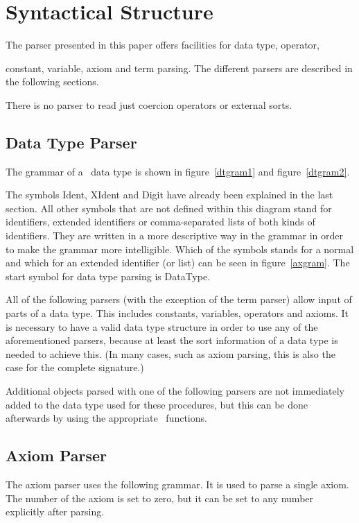 \section{Syntactical Structure}

The parser presented in this paper offers facilities for data type, operator,

constant, variable, axiom and term parsing. The different parsers are described
in the following sections.

There is no parser to read just coercion operators or external sorts.

\subsection{Data Type Parser}
The grammar of a \redux\ data type is shown in figure~\ref{dtgram1} and
figure~\ref{dtgram2}.

The symbols {\vs Ident}, {\vs XIdent} and {\vs Digit} 
have already been explained in the last section.
All other symbols that are
not defined within this diagram stand for identifiers, extended
identifiers or comma-separated lists of both kinds of identifiers.
They are written in a more descriptive way in the grammar
in order to make the grammar more intelligible. Which of the symbols
stands for a normal and which for an extended identifier (or list) can be seen
in figure~\ref{axgram}. The start symbol for data type parsing is
{\vs DataType}.


All of the following parsers (with the exception of the term parser)
allow input of parts of a data type. This includes constants, variables,
operators and axioms. It is necessary to have a valid data type structure
in order to use any of the aforementioned parsers, because at least
the sort information of a data type is needed to achieve this.
(In many cases, such as
axiom parsing, this is also the case for the complete signature.)


Additional objects parsed with one of the following parsers are not immediately
added to the data type used for these procedures, but this can be done
afterwards by using the appropriate \redux\ functions.

\subsection{Axiom Parser}
The axiom parser uses the following grammar.
It is used to parse a single axiom.
The number of the axiom is set to zero, but it can be set to any number
explicitly after parsing.
\begin{center}
\end{center}


